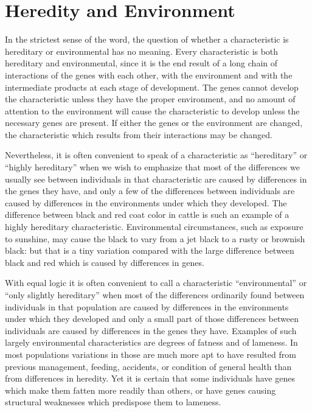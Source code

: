 \chapter{Heredity and Environment}
\label{cha:heredity-and-environment}

In the strictest sense of the word, the question of whether a characteristic
is hereditary or environmental has no meaning. Every characteristic
is both hereditary and environmental, since it is the end result of a
long chain of interactions of the genes with each other, with the environment
and with the intermediate products at each stage of development.
The genes cannot develop the characteristic unless they have the
proper environment, and no amount of attention to the environment
will cause the characteristic to develop unless the necessary genes are
present. If either the genes or the environment are changed, the characteristic
which results from their interactions may be changed.

Nevertheless, it is often convenient to speak of a characteristic as
``hereditary'' or ``highly hereditary'' when we wish to emphasize that
most of the differences we usually see between individuals in that characteristic
are caused by differences in the genes they have, and only a
few of the differences between individuals are caused by differences in
the environments under which they developed. The difference between
black and red coat color in cattle is such an example of a highly hereditary
characteristic. Environmental circumstances, such as exposure to
sunshine, may cause the black to vary from a jet black to a rusty or
brownish black: but that is a tiny variation compared with the large
difference between black and red which is caused by differences in
genes.

With equal logic it is often convenient to call a characteristic ``environmental''
or ``only slightly hereditary'' when most of the differences
ordinarily found between individuals in that population are caused by
differences in the environments under which they developed and only
a small part of those differences between individuals are caused by differences
in the genes they have. Examples of such largely environmental
characteristics are degrees of fatness and of lameness. In most
populations variations in those are much more apt to have resulted
from previous management, feeding, accidents, or condition of general
health than from differences in heredity. Yet it is certain that some
individuals have genes which make them fatten more readily than others, or
have genes causing structural weaknesses which predispose them to
lameness.

